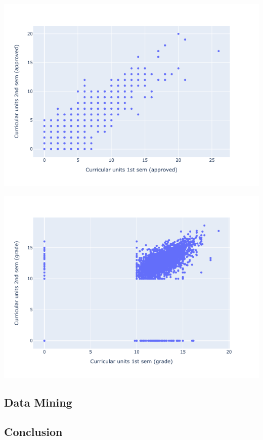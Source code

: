 \documentclass[
  letterpaper,
  DIV=11,
  numbers=noendperiod]{scrartcl}
\begin{document}
\includegraphics{report_AzadhdhinNedalYunisAlFraijat_files/figure-pdf/cell-49-output-1.png}

\includegraphics{report_AzadhdhinNedalYunisAlFraijat_files/figure-pdf/cell-50-output-1.png}

\hypertarget{data-mining}{%
\subsection{Data Mining}\label{data-mining}}

\hypertarget{conclusion}{%
\subsection{\texorpdfstring{\textbf{Conclusion}}{Conclusion}}\label{conclusion}}
\end{document}
